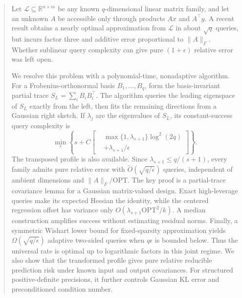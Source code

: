 \documentclass[twoside]{article}
\newcommand{\R}{\mathbb R}
\newcommand{\cL}{\mathcal L}
\newcommand{\OPT}{\mathrm{OPT}}
\begin{document}
\runningauthor{}


\begin{abstract}
Let $\cL\subseteq\R^{n\times m}$ be any known $q$-dimensional linear matrix family, and let an unknown $A$ be accessible only through products $Ax$ and $A^\top y$. A recent result obtains a nearly optimal approximation from $\cL$ in about $\sqrt q$ queries, but incurs factor three and additive error proportional to $\|A\|_F$. Whether sublinear query complexity can give pure $(1+\epsilon)$ relative error was left open.

We resolve this problem with a polynomial-time, nonadaptive algorithm. For a Frobenius-orthonormal basis $B_1,\ldots,B_q$, form the basis-invariant partial trace $S_L=\sum_iB_iB_i^\top$. The algorithm queries the leading eigenspace of $S_L$ exactly from the left, then fits the remaining directions from a Gaussian right sketch. If $\lambda_j$ are the eigenvalues of $S_L$, its constant-success query complexity is \[ \min_s\left\{s+C\left[
 \begin{aligned}
 &\max\{1,\lambda_{s+1}\}\log^2(2q)\\
 &+\lambda_{s+1}/\epsilon
 \end{aligned}\right]\right\}.
\] The transposed profile is also available. Since $\lambda_{s+1}\le q/(s+1)$, every family admits pure relative error with $\widetilde O(\sqrt{q/\epsilon})$ queries, independent of ambient dimensions and $\|A\|_F/\OPT$. The key proof is a partial-trace covariance lemma for a Gaussian matrix-valued design. Exact high-leverage queries make its expected Hessian the identity, while the centered regression offset has variance only $O(\lambda_{s+1}\OPT^2/k)$. A median construction amplifies success without estimating residual norms. Finally, a symmetric Wishart lower bound for fixed-sparsity approximation yields $\Omega(\sqrt{q/\epsilon})$ adaptive two-sided queries when $q\epsilon$ is bounded below. Thus the universal rate is optimal up to logarithmic factors in this joint regime. We also show that the transformed profile gives pure relative reducible prediction risk under known input and output covariances. For structured positive-definite precisions, it further controls Gaussian KL error and preconditioned condition number.
\end{abstract}
\end{document}
